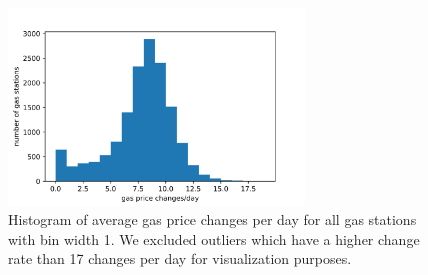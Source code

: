 \begin{figure}
  \centering
    \includegraphics[width=0.7\textwidth
    ]{img/gas-price-change-rate.png}
    \caption{Histogram of average gas price changes per day for all gas stations with bin width 1. We excluded outliers which have a higher change rate than 17 changes per day for visualization purposes.}
    \label{fig:gas-price-change-rate}
\end{figure}